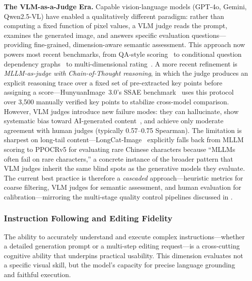 \textbf{The VLM-as-a-Judge Era.}
Capable vision-language models (GPT-4o, Gemini, Qwen2.5-VL) have enabled a qualitatively different paradigm: rather than computing a fixed function of pixel values, a VLM judge reads the prompt, examines the generated image, and answers specific evaluation questions---providing fine-grained, dimension-aware semantic assessment. This approach now powers most recent benchmarks, from QA-style scoring~\citep{chen2025r2ibench} to conditional question dependency graphs~\citep{OneIG-Bench} to multi-dimensional rating~\citep{ImagenWorld}. A more recent refinement is \emph{MLLM-as-judge with Chain-of-Thought reasoning}, in which the judge produces an explicit reasoning trace over a fixed set of pre-extracted key points before assigning a score---HunyuanImage~3.0's SSAE benchmark~\citep{cao2025hunyuanimage} uses this protocol over 3{,}500 manually verified key points to stabilize cross-model comparison. However, VLM judges introduce new failure modes: they can hallucinate, show systematic bias toward AI-generated content~\citep{taesiri2025understanding}, and achieve only moderate agreement with human judges (typically 0.57--0.75 Spearman). The limitation is sharpest on long-tail content---LongCat-Image~\citep{team2025longcat} explicitly falls back from MLLM scoring to PPOCRv5 for evaluating rare Chinese characters because ``MLLMs often fail on rare characters,'' a concrete instance of the broader pattern that VLM judges inherit the same blind spots as the generative models they evaluate. The current best practice is therefore a \emph{cascaded} approach---heuristic metrics for coarse filtering, VLM judges for semantic assessment, and human evaluation for calibration---mirroring the multi-stage quality control pipelines discussed in .


\subsubsection{Instruction Following and Editing Fidelity}

The ability to accurately understand and execute complex instructions---whether a detailed generation prompt or a multi-step editing request---is a cross-cutting cognitive ability that underpins practical usability. This dimension evaluates not a specific visual skill, but the model's capacity for precise language grounding and faithful execution.

